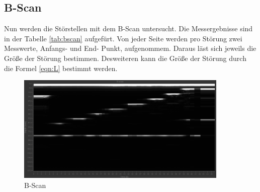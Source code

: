 \subsection{B-Scan}
Nun werden die Störstellen mit dem B-Scan untersucht.
Die Messergebnisse sind in der Tabelle \ref{tab:bscan} aufgefürt.
Von jeder Seite werden pro Störung zwei Messwerte, Anfangs- und End- Punkt, aufgenommem.
Daraus läst sich jeweils die Größe der Störung bestimmen.
Desweiteren kann die Größe der Störung durch die Formel \ref{eqn:L} bestimmt werden.

\begin{figure}[h!]
  \centering
  \includegraphics[width=0.9\textwidth]{bscan.png}
  \caption{B-Scan \cite{1}}
  \label{fig:bscan}
\end{figure}
\FloatBarrier

